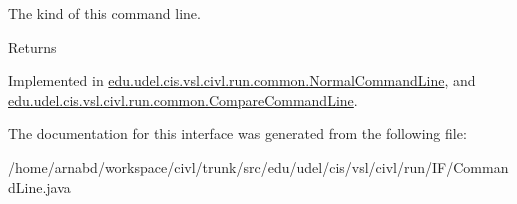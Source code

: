 The kind of this command line. 

\begin{DoxyReturn}{Returns}

\end{DoxyReturn}


Implemented in \hyperlink{classedu_1_1udel_1_1cis_1_1vsl_1_1civl_1_1run_1_1common_1_1NormalCommandLine_a425514422076dd5619251367538443f3}{edu.\+udel.\+cis.\+vsl.\+civl.\+run.\+common.\+Normal\+Command\+Line}, and \hyperlink{classedu_1_1udel_1_1cis_1_1vsl_1_1civl_1_1run_1_1common_1_1CompareCommandLine_a1ba1f2345a6aafd671c0ec12779c6df3}{edu.\+udel.\+cis.\+vsl.\+civl.\+run.\+common.\+Compare\+Command\+Line}.



The documentation for this interface was generated from the following file\+:\begin{DoxyCompactItemize}
\item 
/home/arnabd/workspace/civl/trunk/src/edu/udel/cis/vsl/civl/run/\+I\+F/Command\+Line.\+java\end{DoxyCompactItemize}
